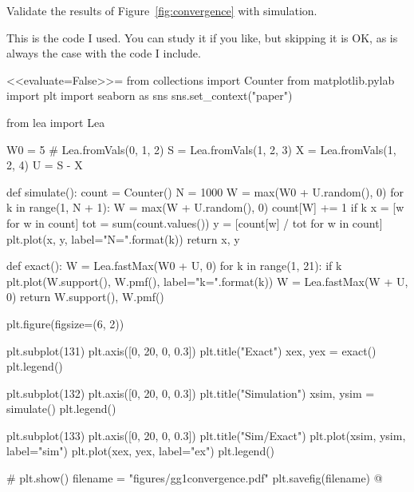 \begin{question}
  Validate the results of  Figure~\ref{fig:convergence} with simulation.
  \begin{solution}
    This is the code I used. You can study it if you like, but
    skipping it is OK, as is always the case with the code I include.


<<evaluate=False>>=
from collections import Counter
from matplotlib.pylab import plt
import seaborn as sns
sns.set_context("paper")

from lea import Lea

W0 = 5  # Lea.fromVals(0, 1, 2)
S = Lea.fromVals(1,  2, 3)
X = Lea.fromVals(1,  2, 4)
U = S - X

def simulate():
    count = Counter()
    N = 1000
    W = max(W0 + U.random(), 0)
    for k in range(1, N + 1):
        W = max(W + U.random(), 0)
        count[W] += 1
        if k %
            x = [w for w in count]
            tot = sum(count.values())
            y = [count[w] / tot for w in count]
            plt.plot(x, y, label="N={}".format(k))
    return x, y


def exact():
    W = Lea.fastMax(W0 + U, 0)
    for k in range(1, 21):
        if k %
            plt.plot(W.support(), W.pmf(), label="k={}".format(k))
        W = Lea.fastMax(W + U, 0)
    return W.support(), W.pmf()


plt.figure(figsize=(6, 2))

plt.subplot(131)
plt.axis([0, 20, 0, 0.3])
plt.title("Exact")
xex, yex = exact()
plt.legend()


plt.subplot(132)
plt.axis([0, 20, 0, 0.3])
plt.title("Simulation")
xsim, ysim = simulate()
plt.legend()

plt.subplot(133)
plt.axis([0, 20, 0, 0.3])
plt.title("Sim/Exact")
plt.plot(xsim, ysim, label="sim")
plt.plot(xex, yex, label="ex")
plt.legend()

# plt.show()
filename = "figures/gg1convergence.pdf"
plt.savefig(filename)
@

\end{solution}
\end{question}

